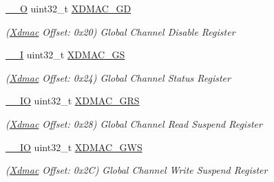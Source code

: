 \begin{DoxyCompactItemize}
\mbox{\label{structXdmac_a52262bdbd2c988f1d87a0cbb98f9cb04}} 
\mbox{\hyperlink{core__cm7_8h_a7e25d9380f9ef903923964322e71f2f6}{\+\_\+\+\_\+O}} uint32\+\_\+t \mbox{\hyperlink{structXdmac_a52262bdbd2c988f1d87a0cbb98f9cb04}{X\+D\+M\+A\+C\+\_\+\+GD}}
\begin{DoxyCompactList}\small\item\em (\mbox{\hyperlink{structXdmac}{Xdmac}} Offset\+: 0x20) Global Channel Disable Register \end{DoxyCompactList}\item 
\mbox{\label{structXdmac_ae21f31aab14d89144e0eccc46a81028f}} 
\mbox{\hyperlink{core__cm7_8h_af63697ed9952cc71e1225efe205f6cd3}{\+\_\+\+\_\+I}} uint32\+\_\+t \mbox{\hyperlink{structXdmac_ae21f31aab14d89144e0eccc46a81028f}{X\+D\+M\+A\+C\+\_\+\+GS}}
\begin{DoxyCompactList}\small\item\em (\mbox{\hyperlink{structXdmac}{Xdmac}} Offset\+: 0x24) Global Channel Status Register \end{DoxyCompactList}\item 
\mbox{\label{structXdmac_ada6643c50a81fa3a966bbcd526c92c92}} 
\mbox{\hyperlink{core__cm7_8h_aec43007d9998a0a0e01faede4133d6be}{\+\_\+\+\_\+\+IO}} uint32\+\_\+t \mbox{\hyperlink{structXdmac_ada6643c50a81fa3a966bbcd526c92c92}{X\+D\+M\+A\+C\+\_\+\+G\+RS}}
\begin{DoxyCompactList}\small\item\em (\mbox{\hyperlink{structXdmac}{Xdmac}} Offset\+: 0x28) Global Channel Read Suspend Register \end{DoxyCompactList}\item 
\mbox{\label{structXdmac_a0b798a0bcf1a4698a117514fce204cae}} 
\mbox{\hyperlink{core__cm7_8h_aec43007d9998a0a0e01faede4133d6be}{\+\_\+\+\_\+\+IO}} uint32\+\_\+t \mbox{\hyperlink{structXdmac_a0b798a0bcf1a4698a117514fce204cae}{X\+D\+M\+A\+C\+\_\+\+G\+WS}}
\begin{DoxyCompactList}\small\item\em (\mbox{\hyperlink{structXdmac}{Xdmac}} Offset\+: 0x2C) Global Channel Write Suspend Register \end{DoxyCompactList}\item 
\mbox{\label{structXdmac_a5b9b148fbd65ee66068ffaac98f4cdfe}} 

\end{DoxyCompactItemize}

